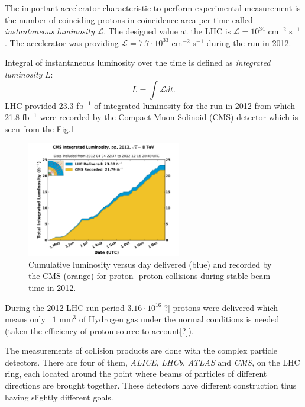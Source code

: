 The important accelerator characteristic to perform experimental measurement is the number of coinciding protons 
in coincidence area per time called \textit{instantaneous luminosity} $\mathcal{L}$. The designed value 
at the LHC is $\mathcal{L} = 10^{34}$ cm$^{-2}$ s$^{-1}$. The accelerator was providing $\mathcal{L} = 7.7 \cdot 10^{33}$ cm$^{-2}$ s$^{-1}$
during the run in 2012.

Integral of instantaneous luminosity over the time
is defined as \textit{integrated luminosity} $L$: 
\begin{equation}\label{eq:lumi}
  L  = \int\mathcal{L}dt.
\end{equation}
LHC provided 23.3 fb$^{-1}$ of integrated luminosity for the run in 2012 from which 21.8 fb$^{-1}$ were
recorded by the Compact Muon Solinoid (CMS) detector which is seen from the Fig.\ref{fig:LumiCMS}

\begin{figure}[t]
  \centering
  \includegraphics[width=0.6\textwidth]{02_experimental_setup/plots/int_lumi_per_day_cumulative_pp_2012.png}
  \caption{Cumulative luminosity versus day delivered (blue) and recorded by the CMS (orange) for proton-
  proton collisions during stable beam time in 2012.}
  \label{fig:LumiCMS}
\end{figure}

During the 2012 LHC run period $3.16 \cdot 10^16$[?] protons were delivered which means only ~$1$ mm$^3$ of Hydrogen gas 
under the normal conditions is needed (taken the efficiency of proton source to account[?]). 

The measurements of collision products are done with the complex particle detectors. There are four of them, 
\textit{ALICE}, \textit{LHCb}, \textit{ATLAS} and \textit{CMS}, on the LHC
ring, each located around the point where beams of particles of different directions are brought together.
These detectors have different construction thus having slightly different goals.

